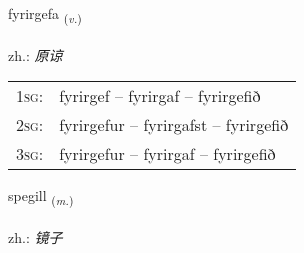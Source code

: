 \documentclass[frontgrid, backgrid]{flacards}\usepackage[]{graphicx}\usepackage[]{xcolor}
\begin{document}
\renewcommand{\flhead}{\vskip5pt \fboxsep=0pt {\small\bfseries\footnotesize Sagnorð | 动词}}
\renewcommand{\fcfoot}{\vskip5pt \fboxsep=0pt \hspace{2pt}{\small\bfseries\footnotesize 3K}}

\renewcommand{\blhead}{\vskip5pt {\small\bfseries\footnotesize Sagnorð | 动词 }}
\renewcommand{\bcfoot}{\vskip5pt \hspace{2pt}{\small\bfseries\footnotesize 3K}}


{fyrirgefa \small{\textsubscript{(\textit{v.})}} \\[1ex] %
\textphonetic{[fɪːrɪrcɛva]} \\
zh.: \emph{原谅} \\  [2ex]
\renewcommand*{\arraystretch}{0.8}
\begin{tabular}{p{1cm}l}
\textsc{1sg}: & fyrirgef -- fyrirgaf -- fyrirgefið \\ 
\textsc{2sg}: & fyrirgefur -- fyrirgafst -- fyrirgefið \\ 
\textsc{3sg}: & fyrirgefur -- fyrirgaf -- fyrirgefið \\ 
\end{tabular}
}

\renewcommand{\flhead}{\vskip5pt \fboxsep=0pt {\small\bfseries\footnotesize Nafnorð | 名词}}
\renewcommand{\fcfoot}{\vskip5pt \fboxsep=0pt \hspace{2pt}{\small\bfseries\footnotesize 3K}}

\renewcommand{\blhead}{\vskip5pt {\small\bfseries\footnotesize Nafnorð | 名词 }}
\renewcommand{\bcfoot}{\vskip5pt \hspace{2pt}{\small\bfseries\footnotesize 3K}}


{spegill \small{\textsubscript{(\textit{m.})}} \\[1ex] %
\textphonetic{[speijɪtl̥]} \\
zh.: \emph{镜子} \\  [2ex]
\renewcommand*{\arraystretch}{0.8}
}
\end{document}

